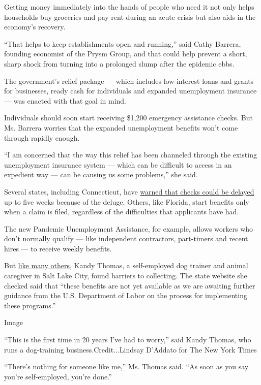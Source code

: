 Getting money immediately into the hands of people who need it not only
helps households buy groceries and pay rent during an acute crisis but
also aids in the economy's recovery.

``That helps to keep establishments open and running,'' said Cathy
Barrera, founding economist of the Prysm Group, and that could help
prevent a short, sharp shock from turning into a prolonged slump after
the epidemic ebbs.

The government's relief package --- which includes low-interest loans
and grants for businesses, ready cash for individuals and expanded
unemployment insurance --- was enacted with that goal in mind.

Individuals should soon start receiving \$1,200 emergency assistance
checks. But Ms. Barrera worries that the expanded unemployment benefits
won't come through rapidly enough.

``I am concerned that the way this relief has been channeled through the
existing unemployment insurance system --- which can be difficult to
access in an expedient way --- can be causing us some problems,'' she
said.

Several states, including Connecticut, have
\href{https://www.stamfordadvocate.com/business/article/CT-governor-cites-5-week-DOL-delay-for-15169776.php}{warned
that checks could be delayed} up to five weeks because of the deluge.
Others, like Florida, start benefits only when a claim is filed,
regardless of the difficulties that applicants have had.

The new Pandemic Unemployment Assistance, for example, allows workers
who don't normally qualify --- like independent contractors, part-timers
and recent hires --- to receive weekly benefits.

But
\href{https://www.nytimes.com/2020/04/08/business/economy/coronavirus-gig-unemployment.html}{like
many others}, Kandy Thomas, a self-employed dog trainer and animal
caregiver in Salt Lake City, found barriers to collecting. The state
website she checked said that ``these benefits are not yet available as
we are awaiting further guidance from the U.S. Department of Labor on
the process for implementing these programs.''

Image

``This is the first time in 20 years I've had to worry,'' said Kandy
Thomas, who runs a dog-training business.Credit...Lindsay D'Addato for
The New York Times

``There's nothing for someone like me,'' Ms. Thomas said. ``As soon as
you say you're self-employed, you're done.''

